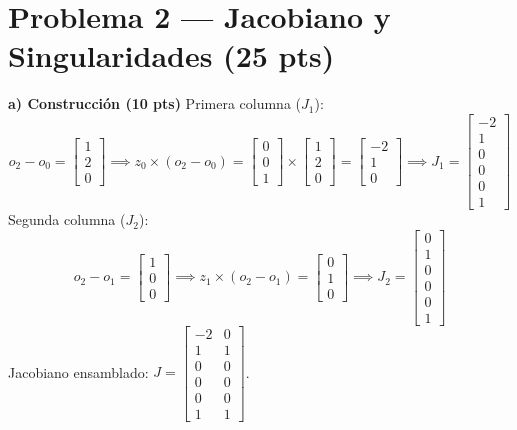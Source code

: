 \documentclass[11pt, a4paper]{article}
\begin{document}
\section*{Problema 2 — Jacobiano y Singularidades (25 pts)}

\textbf{a) Construcción (10 pts)}
Primera columna ($J_1$):
\begin{equation*}
    o_2 - o_0 = \begin{bmatrix} 1 \\ 2 \\ 0 \end{bmatrix} \implies z_0 \times (o_2 - o_0) = \begin{bmatrix} 0 \\ 0 \\ 1 \end{bmatrix} \times \begin{bmatrix} 1 \\ 2 \\ 0 \end{bmatrix} = \begin{bmatrix} -2 \\ 1 \\ 0 \end{bmatrix} \implies J_1 = \boxed{ \begin{bmatrix} -2 \\ 1 \\ 0 \\ 0 \\ 0 \\ 1 \end{bmatrix} } \text{}
\end{equation*}
Segunda columna ($J_2$):
\begin{equation*}
    o_2 - o_1 = \begin{bmatrix} 1 \\ 0 \\ 0 \end{bmatrix} \implies z_1 \times (o_2 - o_1) = \begin{bmatrix} 0 \\ 1 \\ 0 \end{bmatrix} \implies J_2 = \boxed{ \begin{bmatrix} 0 \\ 1 \\ 0 \\ 0 \\ 0 \\ 1 \end{bmatrix} } \text{}
\end{equation*}
Jacobiano ensamblado: $J = \boxed{ \begin{bmatrix} -2 & 0 \\ 1 & 1 \\ 0 & 0 \\ 0 & 0 \\ 0 & 0 \\ 1 & 1 \end{bmatrix} }$.
\end{document}
